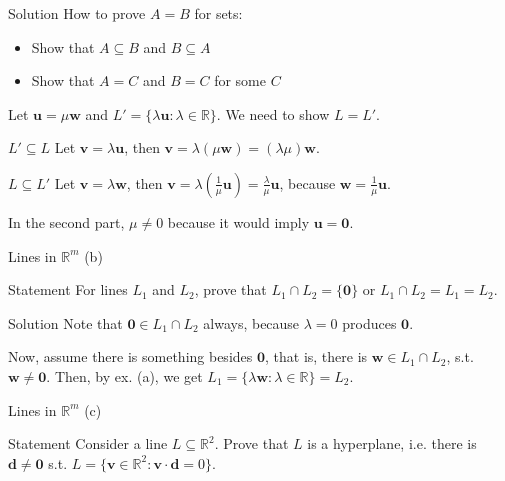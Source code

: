 \documentclass[10pt]{beamer}
\begin{document}
\begin{frame}{Solution}
    How to prove $A=B$ for sets:
    \begin{itemize}
        \item Show that $A \subseteq B$ and $B \subseteq A$
        \item Show that $A = C$ and $B = C$ for some $C$
    \end{itemize}
    
    Let $\mathbf u = \mu \mathbf w$ and $L' = \{\lambda \mathbf u : \lambda \in \mathbb R\}$. We need to show $L = L'$.
    \begin{block}{$L' \subseteq L$}
        Let $\mathbf v = \lambda \mathbf u$, then $\mathbf v = \lambda(\mu \mathbf w) = (\lambda \mu) \mathbf w$.
    \end{block}
    \begin{block}{$L \subseteq L'$}
        Let $\mathbf v = \lambda \mathbf w$, then $\mathbf v = \lambda \left(\frac{1}{\mu} \mathbf u\right) =\frac{\lambda}{\mu} \mathbf u$, because $\mathbf w = \frac{1}{\mu} \mathbf u$.
    \end{block}
    In the second part, $\mu \neq 0$ because it would imply $\mathbf u = \mathbf 0$.
\end{frame}

\begin{frame}{Lines in $\mathbb R^m$ (b)}
    \begin{block}{Statement}
        For lines $L_1$ and $L_2$, prove that $L_1 \cap L_2 = \{\mathbf 0\}$ or $L_1 \cap L_2 = L_1 = L_2$.
    \end{block}
\end{frame}

\begin{frame}{Solution}
    Note that $\mathbf 0 \in L_1 \cap L_2$ always, because $\lambda=0$ produces $\mathbf 0$.

    Now, assume there is something besides $\mathbf 0$, that is, there is $\mathbf w \in L_1 \cap L_2$, s.t. $\mathbf w \neq \mathbf 0$. Then, by ex. (a), we get $L_1 = \{\lambda \mathbf w : \lambda \in \mathbb R\} = L_2$.
\end{frame}

\begin{frame}{Lines in $\mathbb R^m$ (c)}
    \begin{center}
        
    \end{center}
    \begin{block}{Statement}
        Consider a line $L \subseteq \mathbb R^2$. Prove that $L$ is a hyperplane, i.e. there is $\mathbf d \neq \mathbf 0$ s.t. $L = \{\mathbf v \in \mathbb R^2: \mathbf v \cdot \mathbf d = 0\}$.
    \end{block}
\end{frame}
\end{document}
